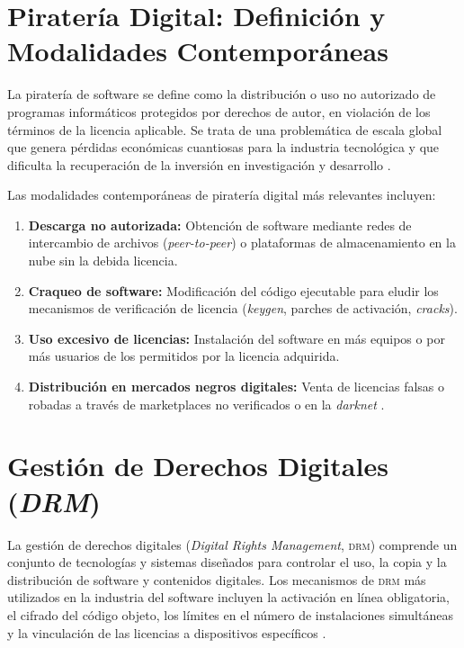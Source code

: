\documentclass[11pt,a4paper]{report}
\begin{document}
\section{Piratería Digital: Definición y Modalidades Contemporáneas}

La piratería de software se define como la distribución o uso no autorizado de programas informáticos protegidos por derechos de autor, en violación de los términos de la licencia aplicable. Se trata de una problemática de escala global que genera pérdidas económicas cuantiosas para la industria tecnológica y que dificulta la recuperación de la inversión en investigación y desarrollo \citep{euipo2022}.

Las modalidades contemporáneas de piratería digital más relevantes incluyen:

\begin{enumerate}[leftmargin=*, label=\arabic*.]
    \item \textbf{Descarga no autorizada:} Obtención de software mediante redes de intercambio de archivos (\textit{peer-to-peer}) o plataformas de almacenamiento en la nube sin la debida licencia.
    \item \textbf{Craqueo de software:} Modificación del código ejecutable para eludir los mecanismos de verificación de licencia (\textit{keygen}, parches de activación, \textit{cracks}).
    \item \textbf{Uso excesivo de licencias:} Instalación del software en más equipos o por más usuarios de los permitidos por la licencia adquirida.
    \item \textbf{Distribución en mercados negros digitales:} Venta de licencias falsas o robadas a través de marketplaces no verificados o en la \textit{darknet} \citep{euipo2022}.
\end{enumerate}

\section{Gestión de Derechos Digitales (\textit{DRM})}

La gestión de derechos digitales (\textit{Digital Rights Management}, \textsc{drm}) comprende un conjunto de tecnologías y sistemas diseñados para controlar el uso, la copia y la distribución de software y contenidos digitales. Los mecanismos de \textsc{drm} más utilizados en la industria del software incluyen la activación en línea obligatoria, el cifrado del código objeto, los límites en el número de instalaciones simultáneas y la vinculación de las licencias a dispositivos específicos \citep{euipo2022}.
\end{document}
